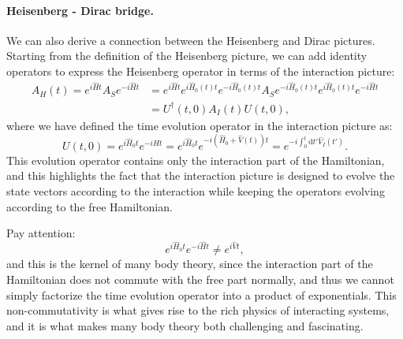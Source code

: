 \paragraph{Heisenberg - Dirac bridge.}
We can also derive a connection between the Heisenberg and Dirac pictures. Starting from the definition of the Heisenberg picture, we can add identity operators to express the Heisenberg operator in terms of the interaction picture:
\[
    \begin{aligned}
        A_H(t) = e^{i \hat{H} t} A_S e^{-i \hat{H} t} & = e^{i \hat{H} t} e^{i \hat{H}_0(t) t} e^{-i \hat{H}_0(t) t} A_S e^{-i \hat{H}_0(t) t} e^{i \hat{H}_0(t) t} e^{-i \hat{H}t} \\
                                                      & = U^\dagger(t,0) A_I(t) U(t,0),
    \end{aligned}
\]
where we have defined the time evolution operator in the interaction picture as:
\[
    U(t,0) = e^{i \hat{H}_0 t} e^{-i \hat{H} t} = e^{i \hat{H}_0 t} e^{-i (\hat{H}_0 + \hat{V}(t)) t} = e^{-i \int_0^t \mathrm{d} t' \hat{V}_I(t')}.
\]
This evolution operator contains only the interaction part of the Hamiltonian, and this highlights the fact that the interaction picture is designed to evolve the state vectors according to the interaction while keeping the operators evolving according to the free Hamiltonian.

Pay attention:
\[
    e^{i \hat{H}_0 t} e^{-i \hat{H} t} \neq e^{i \hat{V} t},
\]
and this is the kernel of many body theory, since the interaction part of the Hamiltonian does not commute with the free part normally, and thus we cannot simply factorize the time evolution operator into a product of exponentials. This non-commutativity is what gives rise to the rich physics of interacting systems, and it is what makes many body theory both challenging and fascinating.

